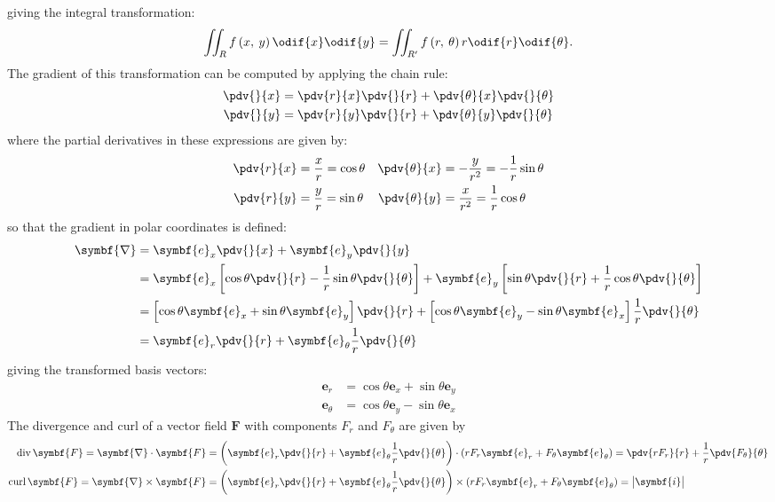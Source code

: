 \documentclass{article}
\DeclareMathOperator{\divergence}{div}
\DeclareMathOperator{\curl}{curl}
\begin{document}
giving the integral transformation:
\begin{equation*}
    \iint_{R} f\left( x, \: y \right) \odif{x} \odif{y} = \iint_{R'} f\left( r, \: \theta \right) r \odif{r} \odif{\theta}.
\end{equation*}
The gradient of this transformation can be computed by applying the
chain rule:
\begin{align*}
    \pdv{}{x} & = \pdv{r}{x} \pdv{}{r} + \pdv{\theta}{x} \pdv{}{\theta} \\
    \pdv{}{y} & = \pdv{r}{y} \pdv{}{r} + \pdv{\theta}{y} \pdv{}{\theta}
\end{align*}
where the partial derivatives in these expressions are given by:
\begin{align*}
    \pdv{r}{x} & = \frac{x}{r} = \cos{\theta} & \pdv{\theta}{x} & = -\frac{y}{r^2} = -\frac{1}{r}\sin{\theta} \\
    \pdv{r}{y} & = \frac{y}{r} = \sin{\theta} & \pdv{\theta}{y} & = \frac{x}{r^2} = \frac{1}{r}\cos{\theta}
\end{align*}
so that the gradient in polar coordinates is defined:
\begin{align*}
    \symbf{\nabla} & = \symbf{e}_x \pdv{}{x} + \symbf{e}_y \pdv{}{y}                                                                                                                                             \\
                   & = \symbf{e}_x \left[ \cos{\theta} \pdv{}{r} - \frac{1}{r} \sin{\theta} \pdv{}{\theta} \right] + \symbf{e}_y \left[ \sin{\theta} \pdv{}{r} + \frac{1}{r} \cos{\theta} \pdv{}{\theta} \right] \\
                   & = \left[ \cos{\theta} \symbf{e}_x + \sin{\theta} \symbf{e}_y \right] \pdv{}{r} + \left[ \cos{\theta} \symbf{e}_y - \sin{\theta} \symbf{e}_x \right] \frac{1}{r} \pdv{}{\theta}              \\
                   & = \symbf{e}_r \pdv{}{r} + \symbf{e}_\theta \frac{1}{r} \pdv{}{\theta}
\end{align*}
giving the transformed basis vectors:
\begin{align*}
    \symbf{e}_r      & = \cos{\theta} \symbf{e}_x + \sin{\theta} \symbf{e}_y \\
    \symbf{e}_\theta & = \cos{\theta} \symbf{e}_y - \sin{\theta} \symbf{e}_x
\end{align*}
The divergence and curl of a vector field \(\symbf{F}\) with components
\(F_r\) and \(F_\theta\) are given by
\begin{align*}
    \divergence \symbf{F} = \symbf{\nabla} \cdot \symbf{F}  & = \left( \symbf{e}_r \pdv{}{r} + \symbf{e}_\theta \frac{1}{r} \pdv{}{\theta} \right) \cdot \left( r F_r \symbf{e}_r + F_\theta \symbf{e}_\theta \right) = \pdv{r F_r}{r} + \frac{1}{r} \pdv{F_\theta}{\theta} \\
    \curl \symbf{F}       = \symbf{\nabla} \times \symbf{F} & = \left( \symbf{e}_r \pdv{}{r} + \symbf{e}_\theta \frac{1}{r} \pdv{}{\theta} \right) \times \left( r F_r \symbf{e}_r + F_\theta \symbf{e}_\theta \right) =
    \begin{vmatrix}
        \symbf{i}
    \end{vmatrix}
\end{align*}
\end{document}

